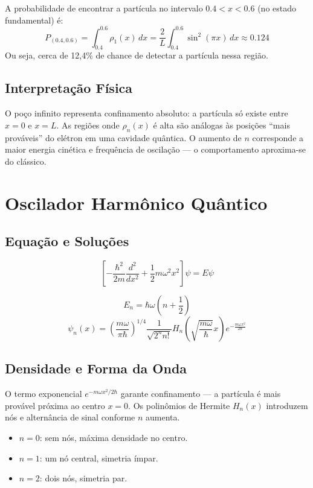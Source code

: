 \documentclass[12pt,a4paper]{article}
\begin{document}
A probabilidade de encontrar a partícula no intervalo \(0.4<x<0.6\) (no estado fundamental) é:
\[
P_{(0.4,0.6)} = \int_{0.4}^{0.6}\!\rho_1(x)\,dx = \frac{2}{L}\int_{0.4}^{0.6}\!\sin^2(\pi x)\,dx \approx 0.124
\]
Ou seja, cerca de 12,4\% de chance de detectar a partícula nessa região.

\subsection*{Interpretação Física}

O poço infinito representa confinamento absoluto: a partícula só existe entre \(x=0\) e \(x=L\).  
As regiões onde \(\rho_n(x)\) é alta são análogas às posições “mais prováveis” do elétron em uma cavidade quântica.  
O aumento de \(n\) corresponde a maior energia cinética e frequência de oscilação — o comportamento aproxima-se do clássico.


\section{Oscilador Harmônico Quântico}

\subsection*{Equação e Soluções}

\[
\left[-\frac{\hbar^2}{2m}\frac{d^2}{dx^2}+\frac{1}{2}m\omega^2x^2\right]\psi = E\psi
\]

\[
E_n=\hbar\omega\left(n+\frac{1}{2}\right)
\]
\[
\psi_n(x)=\left(\frac{m\omega}{\pi\hbar}\right)^{1/4}\frac{1}{\sqrt{2^nn!}}H_n\!\left(\sqrt{\frac{m\omega}{\hbar}}x\right)e^{-\frac{m\omega x^2}{2\hbar}}
\]

\subsection*{Densidade e Forma da Onda}

O termo exponencial \(e^{-m\omega x^2/2\hbar}\) garante confinamento — a partícula é mais provável próxima ao centro \(x=0\).  
Os polinômios de Hermite \(H_n(x)\) introduzem nós e alternância de sinal conforme \(n\) aumenta.

\begin{itemize}
\item \(n=0\): sem nós, máxima densidade no centro.  
\item \(n=1\): um nó central, simetria ímpar.  
\item \(n=2\): dois nós, simetria par.
\end{itemize}
\end{document}
